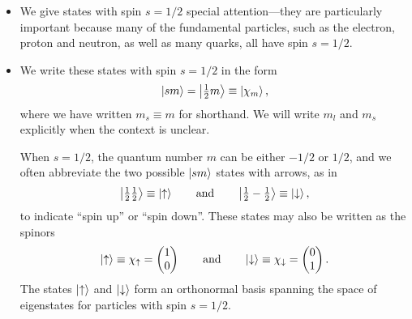 \documentclass[11pt, a4paper]{article}
\newcommand{\eqtext}[1]{\qquad \text{#1} \qquad}
\newcommand{\ua}{\uparrow}  %
\newcommand{\da}{\downarrow}  %
\begin{document}
\begin{itemize}
	
    \item We give states with spin $ s = 1/2 $ special attention---they are particularly important because many of the fundamental particles, such as the electron, proton and neutron, as well as many quarks, all have spin $ s = 1/2 $. 

    \item We write these states with spin $ s = 1/2 $ in the form
	\begin{equation*}
		\ket{sm} = \ket{\tfrac{1}{2} m} \equiv \ket{\chi_{m}},
	\end{equation*}
    where we have written $ m_{s} \equiv m $ for shorthand. We will write $ m_{l} $ and $ m_{s} $ explicitly when the context is unclear.

	When $ s = 1/2 $, the quantum number $ m $ can be either $ -1/2 $ or $ 1/2 $, and we often abbreviate the two possible $ \ket{sm} $  states with arrows, as in
	\begin{equation*}
		\ket{\tfrac{1}{2}\tfrac{1}{2}} \equiv \ket{\ua} \eqtext{and} \ket{\tfrac{1}{2}-\tfrac{1}{2}} \equiv \ket{\da},
	\end{equation*}
	to indicate ``spin up'' or ``spin down''. These states may also be written as the spinors
	\begin{equation*}
		\ket{\ua}  \equiv \chi_{\ua} = 
		\begin{pmatrix}
			1\\
			0
		\end{pmatrix}
		\eqtext{and}
		\ket{\da}  \equiv \chi_{\da} = 
		\begin{pmatrix}
			0\\
			1
		\end{pmatrix}.
	\end{equation*}
	The states $ \ket{\ua} $ and $ \ket{\da} $ form an orthonormal basis spanning the space of eigenstates for particles with spin $ s = 1/2 $.
	

\end{itemize}
\end{document}
